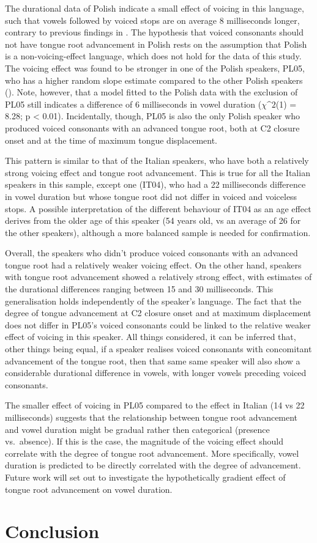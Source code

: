 \documentclass[authoryear, twocolumn]{elsarticle}
\begin{document}
The durational data of Polish indicate a small effect of voicing in this
language, such that vowels followed by voiced stops are on average 8
milliseconds longer, contrary to previous findings in
\citet{keating1984}. The hypothesis that voiced consonants should not
have tongue root advancement in Polish rests on the assumption that
Polish is a non-voicing-effect language, which does not hold for the
data of this study. The voicing effect was found to be stronger in one
of the Polish speakers, PL05, who has a higher random slope estimate
compared to the other Polish speakers (). Note,
however, that a model fitted to the Polish data with the exclusion of
PL05 still indicates a difference of 6 milliseconds in vowel duration
(\(\chi\^2\)(1) = 8.28; p \textless{} 0.01). Incidentally, though, PL05
is also the only Polish speaker who produced voiced consonants with an
advanced tongue root, both at C2 closure onset and at the time of
maximum tongue displacement.

This pattern is similar to that of the Italian speakers, who have both a
relatively strong voicing effect and tongue root advancement. This is
true for all the Italian speakers in this sample, except one (IT04), who
had a 22 milliseconds difference in vowel duration but whose tongue root
did not differ in voiced and voiceless stops. A possible interpretation
of the different behaviour of IT04 as an age effect derives from the
older age of this speaker (54 years old, vs an average of 26 for the
other speakers), although a more balanced sample is needed for
confirmation.

Overall, the speakers who didn't produce voiced consonants with an
advanced tongue root had a relatively weaker voicing effect. On the
other hand, speakers with tongue root advancement showed a relatively
strong effect, with estimates of the durational differences ranging
between 15 and 30 milliseconds. This generalisation holds independently
of the speaker's language. The fact that the degree of tongue
advancement at C2 closure onset and at maximum displacement does not
differ in PL05's voiced consonants could be linked to the relative
weaker effect of voicing in this speaker. All things considered, it can
be inferred that, other things being equal, if a speaker realises voiced
consonants with concomitant advancement of the tongue root, then that
same same speaker will also show a considerable durational difference in
vowels, with longer vowels preceding voiced consonants.

The smaller effect of voicing in PL05 compared to the effect in Italian
(14 vs 22 milliseconds) suggests that the relationship between tongue
root advancement and vowel duration might be gradual rather then
categorical (presence vs.~absence). If this is the case, the magnitude
of the voicing effect should correlate with the degree of tongue root
advancement. More specifically, vowel duration is predicted to be
directly correlated with the degree of advancement. Future work will set
out to investigate the hypothetically gradient effect of tongue root
advancement on vowel duration.

\section{Conclusion}
\label{s:conclusion}


\end{document}
